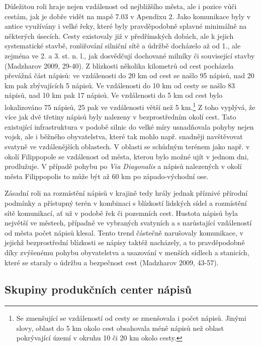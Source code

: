 Důležitou roli hraje nejen vzdálenost od nejbližšího města, ale i pozice vůči cestám, jak je dobře vidět na mapě 7.03 v Apendixu 2. Jako komunikace byly v antice využívány i velké řeky, které byly pravděpodobně splavné minimálně na některých úsecích. Cesty existovaly již v předřímských dobách, ale k jejich systematické stavbě, rozšiřování silniční sítě a údržbě docházelo až od 1., ale zejména ve 2. a 3. st. n. l., jak dosvědčují dochované milníky či související stavby (Madzharov 2009, 29-40). Z blízkosti několika kilometrů od cest pocházela převážná část nápisů: ve vzdálenosti do 20 km od cest se našlo 95  nápisů, nad 20 km pak zbývajících 5  nápisů. Ve vzdálenosti do 10 km od cesty se našlo 83  nápisů, nad 10 km pak 17  nápisů. Ve vzdálenosti do 5 km od cest bylo lokalizováno 75  nápisů, 25  pak ve vzdálenosti větší než 5 km.\footnote{Se zmenšující se vzdáleností od cesty se zmenšovala i počet nápisů. Jinými slovy, oblast do 5 km okolo cest obsahovala méně nápisů než oblast pokrývající území v okruhu 10 či 20 km okolo cesty.} Z toho vyplývá, že více jak dvě třetiny nápisů byly nalezeny v bezprostředním okolí cest. Tato existující infrastruktura v podobě silnic do velké míry usnadňovala pohyby nejen vojsk, ale i běžného obyvatelstva, které tak mohlo např. snadněji navštěvovat svatyně ve vzdálenějších oblastech. V oblasti se schůdným terénem jako např. v okolí Filippopole se vzdálenost od města, kterou bylo možné ujít v jednom dni, prodlužuje. V případě pohybu po {\em Via Diagonalis} a nápisů nalezených v okolí města Filippopolis to může být až 60 km po západo-východní ose.

Zásadní roli na rozmístění nápisů v krajině tedy hrály jednak příznivé přírodní podmínky a přístupný terén v kombinaci s blízkostí lidských sídel a rozmístění sítě komunikací, ať už v podobě řek či pozemních cest. Hustota nápisů byla největší ve městech, případně ve vybraných svatyních a s narůstající vzdáleností od města počet nápisů klesal. Tento trend částečně narušovaly komunikace, v jejichž bezprostřední blízkosti se nápisy taktéž nacházely, a to pravděpodobně díky zvýšenému pohybu obyvatelstva a usazování v menších sídlech a stanicích, které se staraly o údržbu a bezpečnost cest (Madzharov 2009, 43-57).

\subsection[skupiny-produkčních-center-nápisů]{Skupiny produkčních center nápisů}

